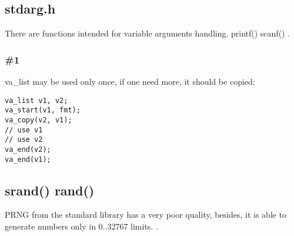 \subsection{stdarg.h}

{There are functions intended for variable arguments handling}.
 printf() \AndENRU scanf() 
.

\subsubsection{ \#1}

 va\_list 
{may be used only once, if one need more, it should be copied}:

\begin{lstlisting}
va_list v1, v2;
va_start(v1, fmt);
va_copy(v2, v1);
// use v1
// use v2
va_end(v2);
va_end(v1);
\end{lstlisting}

\subsection{srand() \AndENRU rand()}

\ac{PRNG} 
{from the standard library has a very poor quality, besides, it is able to generate numbers only in 0..32767
limits}.
.

